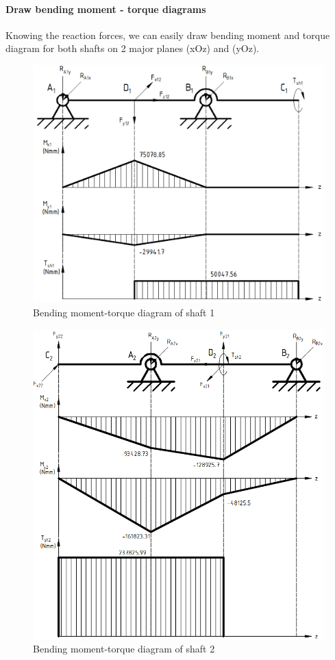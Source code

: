 \paragraph{Draw bending moment - torque diagrams} Knowing the reaction forces, we can easily draw bending moment and torque diagram for both shafts on 2 major planes (xOz) and (yOz).

\begin{figure}[ht]
	\centering
	\includegraphics[width=160mm]{mshaft1.png}
	\caption{Bending moment-torque diagram of shaft 1}
	\label{mshaft1}
\end{figure}

\begin{figure}[ht]
	\centering
	\includegraphics[width=153mm]{mshaft2.png}
	\caption{Bending moment-torque diagram of shaft 2}
	\label{mshaft2}
\end{figure}

